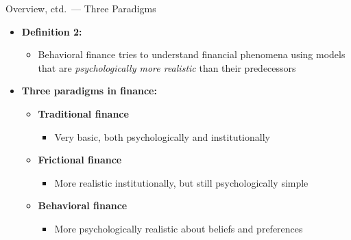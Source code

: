 \documentclass[aspectratio=169, 11pt]{beamer}
\begin{document}
\begin{frame}{Overview, ctd.\ --- Three Paradigms}
\begin{itemize}
\item \textbf{Definition 2:}
  \begin{itemize}
  \item Behavioral finance tries to understand financial phenomena using models that are \emph{psychologically more realistic} than their predecessors
  \end{itemize}
\item \textbf{Three paradigms in finance:}
  \begin{itemize}
  \item \textbf{Traditional finance}
    \begin{itemize}
    \item Very basic, both psychologically and institutionally
    \end{itemize}
  \item \textbf{Frictional finance}
    \begin{itemize}
    \item More realistic institutionally, but still psychologically simple
    \end{itemize}
  \item \textbf{Behavioral finance}
    \begin{itemize}
    \item More psychologically realistic about beliefs and preferences
    \end{itemize}
  \end{itemize}
\end{itemize}
\end{frame}
\end{document}
